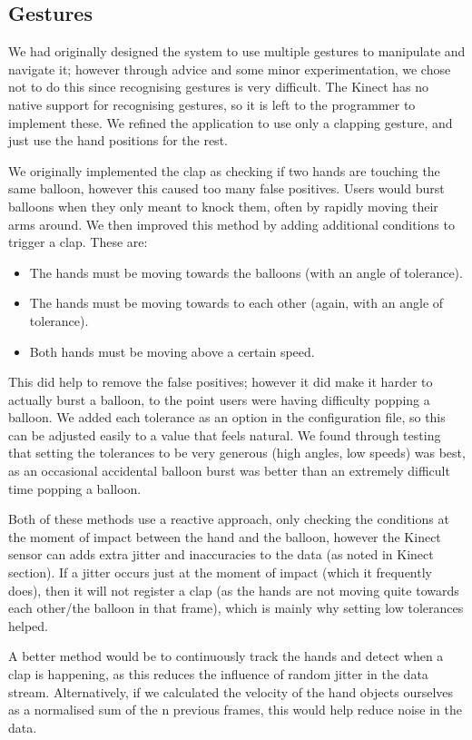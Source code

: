 \clearpage{}
\subsection{Gestures}

We had originally designed the system to use multiple gestures to manipulate and navigate it; however through advice and some minor experimentation, we chose not to do this since recognising gestures is very difficult.
The Kinect has no native support for recognising gestures, so it is left to the programmer to implement these.
We refined the application to use only a clapping gesture, and just use the hand positions for the rest.

We originally implemented the clap as checking if two hands are touching the same balloon, however this caused too many false positives.
Users would burst balloons when they only meant to knock them, often by rapidly moving their arms around.
We then improved this method by adding additional conditions to trigger a clap. These are:

\begin{itemize}
\item{The hands must be moving towards the balloons (with an angle of tolerance).}
\item{The hands must be moving towards to each other (again, with an angle of tolerance).}
\item{Both hands must be moving above a certain speed.}
\end{itemize}

This did help to remove the false positives; however it did make it harder to actually burst a balloon, to the point users were having difficulty popping a balloon.
We added each tolerance as an option in the configuration file, so this can be adjusted easily to a value that feels natural.
We found through testing that setting the tolerances to be very generous (high angles, low speeds) was best, as an occasional accidental balloon burst was better than an extremely difficult time popping a balloon.

Both of these methods use a reactive approach, only checking the conditions at the moment of impact between the hand and the balloon, however the Kinect sensor can adds extra jitter and inaccuracies to the data (as noted in Kinect section).
If a jitter occurs just at the moment of impact (which it frequently does), then it will not register a clap (as the hands are not moving quite towards each other/the balloon in that frame), which is mainly why setting low tolerances helped.

A better method would be to continuously track the hands and detect when a clap is happening, as this reduces the influence of random jitter in the data stream.
Alternatively, if we calculated the velocity of the hand objects ourselves as a normalised sum of the n previous frames, this would help reduce noise in the data.
